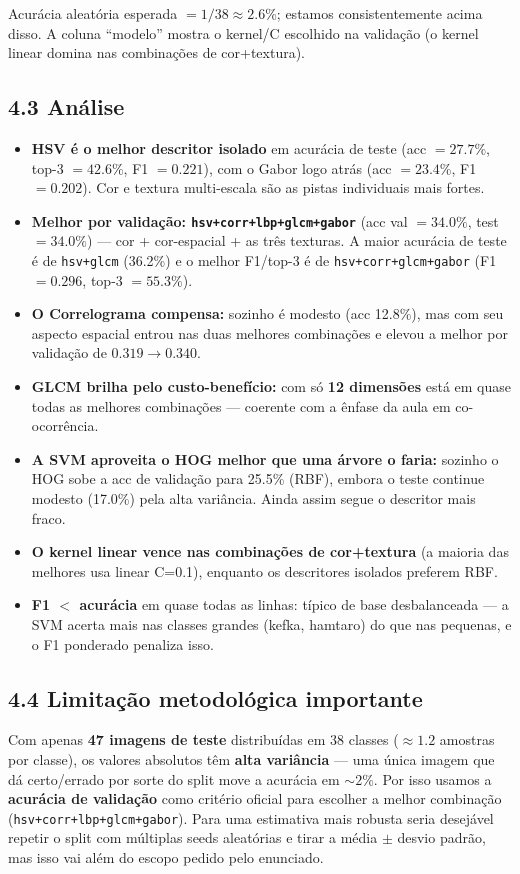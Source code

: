 \documentclass[12pt, a4paper]{article}
\begin{document}
Acurácia aleatória esperada $= 1/38 \approx 2.6\%$; estamos consistentemente acima disso. A coluna ``modelo'' mostra o kernel/C escolhido na validação (o kernel linear domina nas combinações de cor+textura).

\subsection*{4.3 Análise}
\begin{itemize}
    \item \textbf{HSV é o melhor descritor isolado} em acurácia de teste (acc $= 27.7\%$, top-3 $= 42.6\%$, F1 $= 0.221$), com o Gabor logo atrás (acc $= 23.4\%$, F1 $= 0.202$). Cor e textura multi-escala são as pistas individuais mais fortes.
    \item \textbf{Melhor por validação: \texttt{hsv+corr+lbp+glcm+gabor}} (acc val $= 34.0\%$, test $= 34.0\%$) --- cor + cor-espacial + as três texturas. A maior acurácia de teste é de \texttt{hsv+glcm} (36.2\%) e o melhor F1/top-3 é de \texttt{hsv+corr+glcm+gabor} (F1 $= 0.296$, top-3 $= 55.3\%$).
    \item \textbf{O Correlograma compensa:} sozinho é modesto (acc 12.8\%), mas com seu aspecto espacial entrou nas duas melhores combinações e elevou a melhor por validação de $0.319 \to 0.340$.
    \item \textbf{GLCM brilha pelo custo-benefício:} com só \textbf{12 dimensões} está em quase todas as melhores combinações --- coerente com a ênfase da aula em co-ocorrência.
    \item \textbf{A SVM aproveita o HOG melhor que uma árvore o faria:} sozinho o HOG sobe a acc de validação para 25.5\% (RBF), embora o teste continue modesto (17.0\%) pela alta variância. Ainda assim segue o descritor mais fraco.
    \item \textbf{O kernel linear vence nas combinações de cor+textura} (a maioria das melhores usa linear C=0.1), enquanto os descritores isolados preferem RBF.
    \item \textbf{F1 $<$ acurácia} em quase todas as linhas: típico de base desbalanceada --- a SVM acerta mais nas classes grandes (kefka, hamtaro) do que nas pequenas, e o F1 ponderado penaliza isso.
\end{itemize}

\subsection*{4.4 Limitação metodológica importante}
Com apenas \textbf{47 imagens de teste} distribuídas em 38 classes ($\approx 1.2$ amostras por classe), os valores absolutos têm \textbf{alta variância} --- uma única imagem que dá certo/errado por sorte do split move a acurácia em $\sim 2\%$. Por isso usamos a \textbf{acurácia de validação} como critério oficial para escolher a melhor combinação (\texttt{hsv+corr+lbp+glcm+gabor}). Para uma estimativa mais robusta seria desejável repetir o split com múltiplas seeds aleatórias e tirar a média $\pm$ desvio padrão, mas isso vai além do escopo pedido pelo enunciado.
\end{document}
